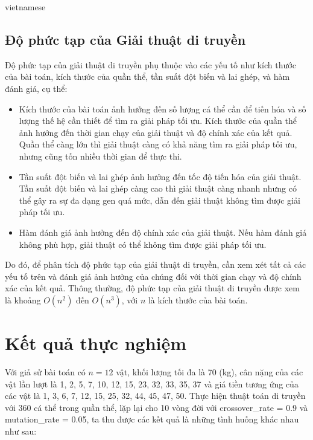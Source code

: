 \documentclass[a4paper]{article}
\begin{document}
\begin{otherlanguage*}{vietnamese}
\begin{enumerate}[leftmargin=7pt]
\begin{itemize}[leftmargin=7pt]
\end{itemize}

\subsection{Độ phức tạp của Giải thuật di truyền}

Độ phức tạp của giải thuật di truyền phụ thuộc vào các yếu tố như kích thước của bài toán, kích thước của quần thể, tần suất đột biến và lai ghép, và hàm đánh giá, cụ thể:

\begin{itemize}[leftmargin=7pt]
\item Kích thước của bài toán ảnh hưởng đến số lượng cá thể cần để tiến hóa và số lượng thế hệ cần thiết để tìm ra giải pháp tối ưu. Kích thước của quần thể ảnh hưởng đến thời gian chạy của giải thuật và độ chính xác của kết quả. Quần thể càng lớn thì giải thuật càng có khả năng tìm ra giải pháp tối ưu, nhưng cũng tốn nhiều thời gian để thực thi.

\item Tần suất đột biến và lai ghép ảnh hưởng đến tốc độ tiến hóa của giải thuật. Tần suất đột biến và lai ghép càng cao thì giải thuật càng nhanh nhưng có thể gây ra sự đa dạng gen quá mức, dẫn đến giải thuật không tìm được giải pháp tối ưu.

\item Hàm đánh giá ảnh hưởng đến độ chính xác của giải thuật. Nếu hàm đánh giá không phù hợp, giải thuật có thể không tìm được giải pháp tối ưu.   
\end{itemize}

Do đó, để phân tích độ phức tạp của giải thuật di truyền, cần xem xét tất cả các yếu tố trên và đánh giá ảnh hưởng của chúng đối với thời gian chạy và độ chính xác của kết quả. Thông thường, độ phức tạp của giải thuật di truyền được xem là khoảng $O(n^2)$ đến $O(n^3)$, với $n$ là kích thước của bài toán.

\section{Kết quả thực nghiệm}

Với giả sử bài toán có $n=12$ vật, khối lượng tối đa là 70 (kg), cân nặng của các vật lần lượt là 1, 2, 5, 7, 10, 12, 15, 23, 32, 33, 35, 37 và giá tiền tương ứng của các vật là 1, 3, 6, 7, 12, 15, 25, 32, 44, 45, 47, 50. Thực hiện thuật toán di truyền với 360 cá thể trong quần thể, lặp lại cho 10 vòng đời với crossover\_rate = 0.9 và mutation\_rate = 0.05, ta thu được các kết quả là những tình huống khác nhau như sau:           


\end{enumerate}
\end{otherlanguage*}
\end{document}
